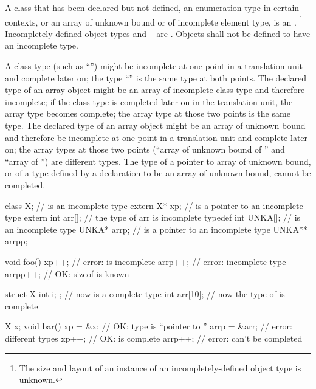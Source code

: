 \pnum
{}%
A class that has been declared but not defined, an enumeration type in certain
contexts, or an array of unknown
bound or of incomplete element type, is an
.%
\footnote{The size and layout of an instance of an incompletely-defined
object type is unknown.}
Incompletely-defined object types and \cv{}~ are
.
Objects shall not be defined to have an
incomplete type.

\pnum
A class type (such as ``'') might be incomplete at one
point in a translation unit and complete later on; the type
``'' is the same type at both points. The declared type
of an array object might be an array of incomplete class type and
therefore incomplete; if the class type is completed later on in the
translation unit, the array type becomes complete; the array type at
those two points is the same type. The declared type of an array object
might be an array of unknown bound and therefore be incomplete at one
point in a translation unit and complete later on; the array types at
those two points (``array of unknown bound of '' and ``array of
 '') are different types. The type of a pointer to array of
unknown bound, or of a type defined by a  declaration to
be an array of unknown bound, cannot be completed.
\begin{example}
%
\begin{codeblock}
class X;                        //  is an incomplete type
extern X* xp;                   //  is a pointer to an incomplete type
extern int arr[];               // the type of arr is incomplete
typedef int UNKA[];             //  is an incomplete type
UNKA* arrp;                     //  is a pointer to an incomplete type
UNKA** arrpp;

void foo() {
  xp++;                         // error:  is incomplete
  arrp++;                       // error: incomplete type
  arrpp++;                      // OK: sizeof  is known
}

struct X { int i; };            // now  is a complete type
int  arr[10];                   // now the type of  is complete

X x;
void bar() {
  xp = &x;                      // OK; type is ``pointer to ''
  arrp = &arr;                  // error: different types
  xp++;                         // OK:   is complete
  arrp++;                       // error:  can't be completed
}
\end{codeblock}
\end{example}


